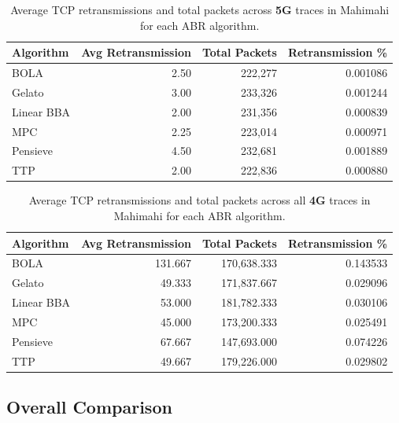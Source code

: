 \begin{table}[t!]
\centering
\small
\caption{Average TCP retransmissions and total packets across \textbf{5G} traces in Mahimahi for each ABR algorithm.}
\label{tab:tcp-5g-mahimahi}
\begin{tabular}{@{\hskip 6pt}l@{\hskip 6pt}r@{\hskip 6pt}r@{\hskip 6pt}r@{\hskip 6pt}}
\toprule
\textbf{Algorithm} & \textbf{Avg Retransmission} & \textbf{Total Packets} & \textbf{Retransmission \%} \\
\midrule
BOLA      & 2.50   & 222{,}277   & 0.001086 \\
Gelato    & 3.00   & 233{,}326   & 0.001244 \\
Linear BBA & 2.00   & 231{,}356   & 0.000839 \\
MPC       & 2.25   & 223{,}014   & 0.000971 \\
Pensieve  & 4.50  & 232{,}681   & 0.001889 \\
TTP       & 2.00   & 222{,}836   & 0.000880 \\
\bottomrule
\end{tabular}
\end{table}

\begin{table}[t!]
\centering
\small
\caption{Average TCP retransmissions and total packets across all \textbf{4G} traces in Mahimahi for each ABR algorithm.}
\label{tab:tcp-4g}
\begin{tabular}{@{\hskip 6pt}l@{\hskip 6pt}r@{\hskip 6pt}r@{\hskip 6pt}r@{\hskip 6pt}}
\toprule
\textbf{Algorithm} & \textbf{Avg Retransmission} & \textbf{Total Packets} & \textbf{Retransmission \%} \\
\midrule
BOLA      & 131.667  & 170{,}638.333   & 0.143533 \\
Gelato    & 49.333   & 171{,}837.667   & 0.029096 \\
Linear BBA & 53.000   & 181{,}782.333   & 0.030106 \\
MPC       & 45.000   & 173{,}200.333   & 0.025491 \\
Pensieve  & 67.667   & 147{,}693.000   & 0.074226 \\
TTP       & 49.667   & 179{,}226.000   & 0.029802 \\
\bottomrule
\end{tabular}
\end{table}

\vspace{50pt}
\subsection{Overall Comparison}

